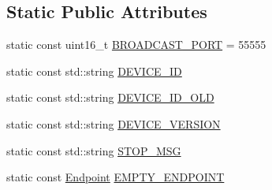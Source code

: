 \subsection*{Static Public Attributes}
\begin{DoxyCompactItemize}
\item 
static const uint16\-\_\-t \hyperlink{class_broadcast_receiver_a38d37ce60dc1fb1e0dbc08d80b5d3b47}{B\-R\-O\-A\-D\-C\-A\-S\-T\-\_\-\-P\-O\-R\-T} = 55555
\item 
static const std\-::string \hyperlink{class_broadcast_receiver_a7314a4107fc6e1c3d8dbace2b47c07d1}{D\-E\-V\-I\-C\-E\-\_\-\-I\-D}
\item 
static const std\-::string \hyperlink{class_broadcast_receiver_addb5597142e98c3c16afce397082d960}{D\-E\-V\-I\-C\-E\-\_\-\-I\-D\-\_\-\-O\-L\-D}
\item 
static const std\-::string \hyperlink{class_broadcast_receiver_ae22c7443414e66b3e50911e91f6d6e35}{D\-E\-V\-I\-C\-E\-\_\-\-V\-E\-R\-S\-I\-O\-N}
\item 
static const std\-::string \hyperlink{class_broadcast_receiver_a6c365a7403457725e25c3124868fd6d9}{S\-T\-O\-P\-\_\-\-M\-S\-G}
\item 
static const \hyperlink{class_endpoint}{Endpoint} \hyperlink{class_broadcast_receiver_a545fbd086416bfa77cd42b531d045a5b}{E\-M\-P\-T\-Y\-\_\-\-E\-N\-D\-P\-O\-I\-N\-T}
\end{DoxyCompactItemize}


